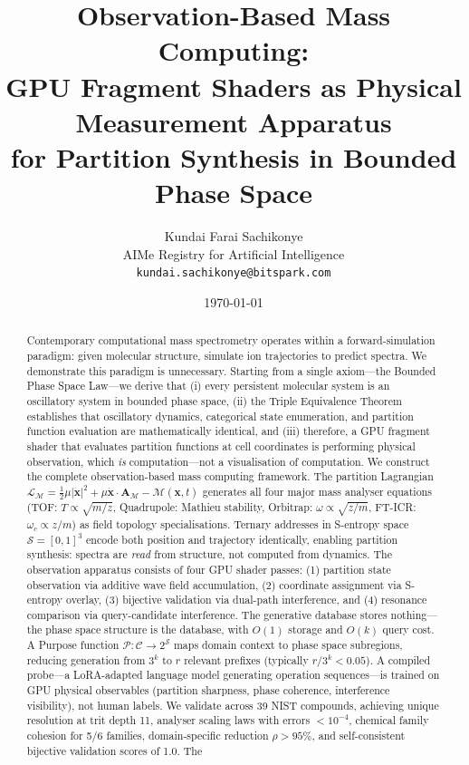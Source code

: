\documentclass[11pt,twocolumn,a4paper]{article}
\theoremstyle{definition}
\theoremstyle{remark}
\newcommand{\Sspace}{\mathcal{S}}
\newcommand{\Depth}{\mathcal{M}}
\newcommand{\partinert}{\mu}
\newcommand{\Apartition}{\mathbf{A}_{\mathcal{M}}}
\newcommand{\Lagr}{\mathcal{L}}
\newcommand{\Purpose}{\mathcal{P}}
\newcommand{\Context}{\mathcal{C}}
\begin{document}
\title{\textbf{Observation-Based Mass Computing: \\
GPU Fragment Shaders as Physical Measurement Apparatus \\
for Partition Synthesis in Bounded Phase Space}}

\author{
Kundai Farai Sachikonye\\[0.3em]
AIMe Registry for Artificial Intelligence\\[0.3em]
\texttt{kundai.sachikonye@bitspark.com}
}

\date{\today}

\maketitle

\begin{abstract}
Contemporary computational mass spectrometry operates within a forward-simulation paradigm: given molecular structure, simulate ion trajectories to predict spectra. We demonstrate this paradigm is unnecessary. Starting from a single axiom---the Bounded Phase Space Law---we derive that (i) every persistent molecular system is an oscillatory system in bounded phase space, (ii) the Triple Equivalence Theorem establishes that oscillatory dynamics, categorical state enumeration, and partition function evaluation are mathematically identical, and (iii) therefore, a GPU fragment shader that evaluates partition functions at cell coordinates is performing physical observation, which \emph{is} computation---not a visualisation of computation. We construct the complete observation-based mass computing framework. The partition Lagrangian $\Lagr_\Depth = \frac{1}{2}\partinert|\dot{\mathbf{x}}|^2 + \partinert\dot{\mathbf{x}}\cdot\Apartition - \Depth(\mathbf{x},t)$ generates all four major mass analyser equations (TOF: $T\propto\sqrt{m/z}$, Quadrupole: Mathieu stability, Orbitrap: $\omega\propto\sqrt{z/m}$, FT-ICR: $\omega_c\propto z/m$) as field topology specialisations. Ternary addresses in S-entropy space $\Sspace = [0,1]^3$ encode both position and trajectory identically, enabling partition synthesis: spectra are \emph{read} from structure, not computed from dynamics. The observation apparatus consists of four GPU shader passes: (1) partition state observation via additive wave field accumulation, (2) coordinate assignment via S-entropy overlay, (3) bijective validation via dual-path interference, and (4) resonance comparison via query-candidate interference. The generative database stores nothing---the phase space structure is the database, with $O(1)$ storage and $O(k)$ query cost. A Purpose function $\Purpose: \Context \to 2^\Sspace$ maps domain context to phase space subregions, reducing generation from $3^k$ to $r$ relevant prefixes (typically $r/3^k < 0.05$). A compiled probe---a LoRA-adapted language model generating operation sequences---is trained on GPU physical observables (partition sharpness, phase coherence, interference visibility), not human labels. We validate across 39 NIST compounds, achieving unique resolution at trit depth 11, analyser scaling laws with errors $<10^{-4}$, chemical family cohesion for 5/6 families, domain-specific reduction $\rho > 95\%$, and self-consistent bijective validation scores of 1.0. The 
\end{abstract}
\end{document}
